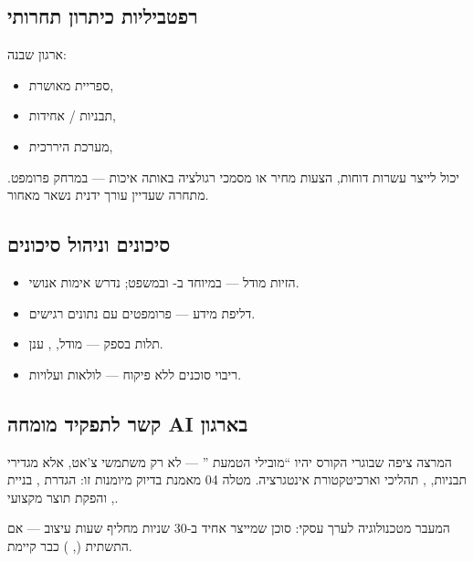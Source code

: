\subsection{רפטביליות כיתרון תחרותי}

ארגון שבנה:
\begin{itemize}[rightmargin=2em]
  \item ספריית  מאושרת,
  \item תבניות / אחידות,
  \item מערכת  היררכית,
\end{itemize}
יכול לייצר עשרות דוחות, הצעות מחיר או מסמכי רגולציה באותה איכות ---
במרחק פרומפט. מתחרה שעדיין עורך  ידנית נשאר מאחור.

\subsection{סיכונים וניהול סיכונים}

\begin{itemize}[rightmargin=2em]
  \item הזיות מודל --- במיוחד ב- ובמשפט; נדרש אימות אנושי.
  \item דליפת מידע --- פרומפטים עם נתונים רגישים.
  \item תלות בספק --- מודל, , ענן.
  \item ריבוי סוכנים ללא פיקוח --- לולאות ועלויות.
\end{itemize}


\subsection{קשר לתפקיד מומחה AI בארגון}

המרצה ציפה שבוגרי הקורס יהיו ``מובילי הטמעת '' --- לא רק משתמשי
צ'אט, אלא מגדירי תבניות, , תהליכי  וארכיטקטורת
אינטגרציה. מטלה 04 מאמנת בדיוק מיומנות זו: הגדרת , בניית ,
והפקת תוצר מקצועי.

\begin{insightbox}
המעבר מטכנולוגיה לערך עסקי: סוכן שמייצר  אחיד ב-30 שניות
מחליף שעות עיצוב --- אם התשתית (, ) כבר קיימת.
\end{insightbox}
